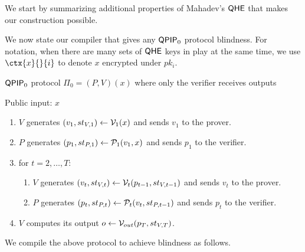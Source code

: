 We start by summarizing additional properties of Mahadev's $\mathsf{QHE}$ that makes our construction possible.


We now state our compiler that gives any $\operatorname{\mathsf{QPIP}}_0$ protocol blindness.
For notation, when there are many sets of $\mathsf{QHE}$ keys in play at the same time,
we use $\ctx{x}{}{i}$ to denote $x$ encrypted under $pk_i$.

\begin{protocol}{$\operatorname{\mathsf{QPIP}}_0$ protocol $\Pi_0=(P, V)(x)$ where only the verifier receives outputs}
	
	Public input: $x$
	\begin{enumerate}
		\item $V$ generates $(v_1, st_{V, 1})\leftarrow\mathcal{V}_1(x)$ and sends $v_1$ to the prover.
		\item $P$ generates $(p_1, st_{P, 1})\leftarrow\mathcal{P}_1(v_1, x)$ and sends $p_1$ to the verifier.
		\item for $t=2,\ldots,T$:
		\begin{enumerate}
			\item $V$ generates $(v_t, st_{V, t})\leftarrow\mathcal{V}_t(p_{t-1}, st_{V, t-1})$ and sends $v_t$ to the prover.
			\item $P$ generates $(p_t, st_{P, t})\leftarrow\mathcal{P}_t(v_t, st_{P, t-1})$ and sends $p_t$ to the verifier.
		\end{enumerate}
		\item $V$ computes its output $o\leftarrow\mathcal{V}_{out}(p_T, st_{V, T})$.
	\end{enumerate}

\end{protocol}

We compile the above protocol to achieve blindness as follows.

